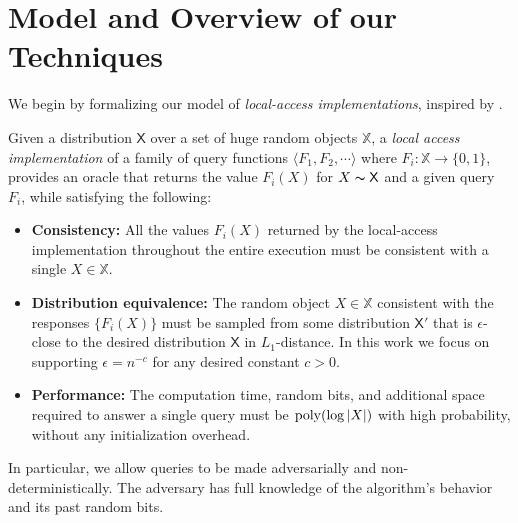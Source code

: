 \section{Model and Overview of our Techniques}
\label{sec:overview_of_our_techniques}
We begin by formalizing our model of \emph{local-access implementations}, inspired by \cite{reut}.

\begin{definition}
\label{def:local_access}
Given a distribution $\mathsf  X$ over a set of huge random objects $\mathbb X$, a \emph{local access implementation}
of a family of query functions $\langle F_1, F_2,\cdots \rangle$ where $F_i: \mathbb X\rightarrow \{0,1\}$,
provides an oracle that returns the value $F_i(X)$ for $X\thicksim \mathsf X$ and a given query $F_i$, while satisfying the following:
\begin{itemize}
    \item \textbf{Consistency:}
    All the values $F_i(X)$ returned by the local-access implementation throughout the entire execution
    must be consistent with a single $X\in \mathbb X$.
    \item \textbf{Distribution equivalence:}
    The random object $X\in \mathbb X$ consistent with the responses $\{ F_i(X)\}$ must be sampled from some distribution $\mathsf{X}'$
    that is $\epsilon$-close to the desired distribution $\mathsf{X}$ in $L_1$-distance.
    In this work we focus on supporting $\epsilon = n^{-c}$ for any desired constant $c>0$.
    \item \textbf{Performance:}
    The computation time, random bits, and additional space required to answer a single query must be $\mathrm{poly}(\log |X|)$ with high probability,
    without any initialization overhead.
\end{itemize}
\end{definition}

In particular, we allow queries to be made adversarially and non-deterministically.
The adversary has full knowledge of the algorithm's behavior and its past random bits.

